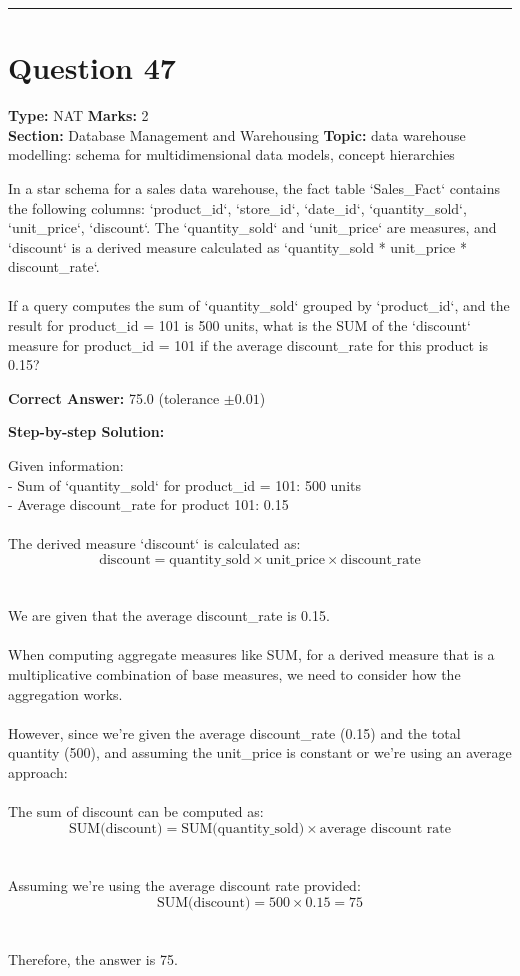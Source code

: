\documentclass[11pt]{article}
\begin{document}
\vspace{0.8em}
\hrule
\vspace{0.4em}
\section*{Question 47}
\textbf{Type:} NAT \hfill \textbf{Marks:} 2\\
\textbf{Section:} Database Management and Warehousing \hfill \textbf{Topic:} data warehouse modelling: schema for multidimensional data models, concept hierarchies

In a star schema for a sales data warehouse, the fact table `Sales\_Fact` contains the following columns: `product\_id`, `store\_id`, `date\_id`, `quantity\_sold`, `unit\_price`, `discount`. The `quantity\_sold` and `unit\_price` are measures, and `discount` is a derived measure calculated as `quantity\_sold * unit\_price * discount\_rate`.\\
\\
If a query computes the sum of `quantity\_sold` grouped by `product\_id`, and the result for product\_id = 101 is 500 units, what is the SUM of the `discount` measure for product\_id = 101 if the average discount\_rate for this product is 0.15?



\textbf{Correct Answer:} 75.0 (tolerance \(\pm 0.01\))

\textbf{Step-by-step Solution:}

Given information:\\
- Sum of `quantity\_sold` for product\_id = 101: 500 units\\
- Average discount\_rate for product 101: 0.15\\
\\
The derived measure `discount` is calculated as:\\
\[\text{discount} = \text{quantity\_sold} \times \text{unit\_price} \times \text{discount\_rate}\]\\
\\
We are given that the average discount\_rate is 0.15.\\
\\
When computing aggregate measures like SUM, for a derived measure that is a multiplicative combination of base measures, we need to consider how the aggregation works.\\
\\
However, since we're given the average discount\_rate (0.15) and the total quantity (500), and assuming the unit\_price is constant or we're using an average approach:\\
\\
The sum of discount can be computed as:\\
\[\text{SUM(discount)} = \text{SUM(quantity\_sold)} \times \text{average discount rate}\]\\
\\
Assuming we're using the average discount rate provided:\\
\[\text{SUM(discount)} = 500 \times 0.15 = 75\]\\
\\
Therefore, the answer is 75.
\end{document}
